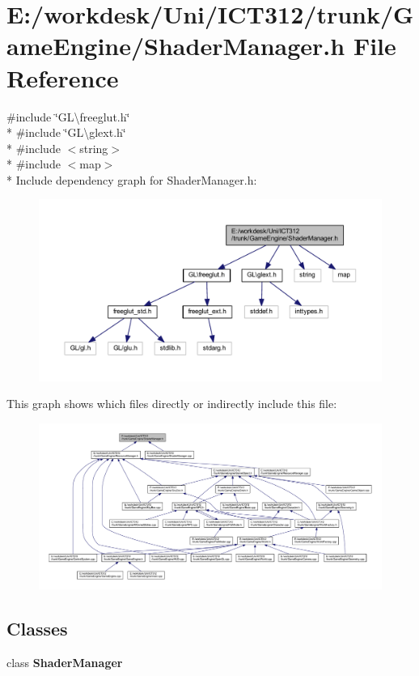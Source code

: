 \section{E\+:/workdesk/\+Uni/\+I\+C\+T312/trunk/\+Game\+Engine/\+Shader\+Manager.h File Reference}
\label{_shader_manager_8h}
{\ttfamily \#include \char`\"{}G\+L\textbackslash{}freeglut.\+h\char`\"{}}\\*
{\ttfamily \#include \char`\"{}G\+L\textbackslash{}glext.\+h\char`\"{}}\\*
{\ttfamily \#include $<$string$>$}\\*
{\ttfamily \#include $<$map$>$}\\*
Include dependency graph for Shader\+Manager.\+h\+:\nopagebreak
\begin{figure}[H]
\begin{center}
\leavevmode
\includegraphics[width=350pt]{d9/d72/_shader_manager_8h__incl}
\end{center}
\end{figure}
This graph shows which files directly or indirectly include this file\+:
\nopagebreak
\begin{figure}[H]
\begin{center}
\leavevmode
\includegraphics[width=350pt]{df/d3c/_shader_manager_8h__dep__incl}
\end{center}
\end{figure}
\subsection*{Classes}
\begin{DoxyCompactItemize}
\item 
class {\bf Shader\+Manager}
\end{DoxyCompactItemize}
